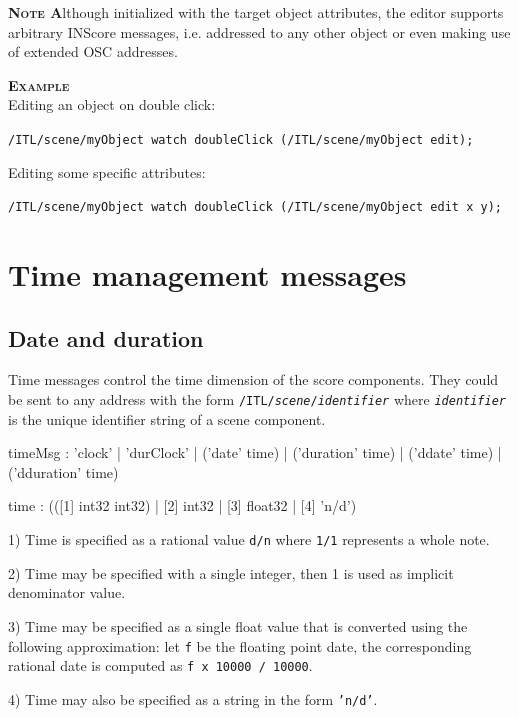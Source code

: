 \documentclass[a4paper,twoside]{report}
\newcommand{\toplevel}[1]	{\chapter{#1}}
\newcommand{\sublevel}[1]	{\section{#1}}
\newcommand{\OSC}[1]		{\texttt{#1}}
\newcommand{\values}[1]		{\texttt{#1}}
\newcommand{\example}		{\textbf{\hspace{-1.5cm}\textbf{\textsc{Example }}}}
\newcommand{\note}	[1]		{\vspace{2mm}\textbf{\hspace{-0.9cm}\textbf{\textsc{Note #1}}}}
\let\olditemize\itemize
\let\oldenditemize\enditemize
\renewenvironment{itemize} 	{\olditemize \setlength{\itemsep}{1mm}}{\oldenditemize}
\newcommand{\sample}	[1]			{\vspace{-2mm}\begin{center}\colorbox{mygrey}{
								\begin{minipage}[t]{0.9\columnwidth} 
								{\small \texttt{#1}}
								\end{minipage}}\end{center}}
\begin{document}
\note Although initialized with the target object attributes, the editor supports arbitrary INScore messages, i.e. addressed to any other object or even making use of extended OSC addresses.

\example \\
Editing an object on double click:
\sample{/ITL/scene/myObject watch doubleClick (/ITL/scene/myObject edit);}
Editing some specific attributes:
\sample{/ITL/scene/myObject watch doubleClick (/ITL/scene/myObject edit x y);}



\toplevel{Time management messages}
\label{time}
\sublevel{Date and duration}
Time messages control the time dimension of the score components. They could be sent to any address with the form \OSC{/ITL/\textit{scene}/\textit{identifier}} where \OSC{\textit{identifier}} is the unique identifier string of a scene component.
\begin{rail}
timeMsg : 'clock'
		| 'durClock' 
		| ('date' time)
		| ('duration' time) 
		| ('ddate' time) 
		| ('dduration' time) 
\end{rail}

\begin{rail}
time : (([1] int32 int32) | [2] int32 | [3] float32 | [4] 'n/d')
\end{rail}

\begin{itemize}
\item 1) Time is specified as a rational value \values{d/n} where \values{1/1} represents a whole note. 
\item 2) Time may be specified with a single integer, then 1 is used as implicit denominator value.
\item 3) Time may be specified as a single float value that is converted using the following approximation: let \values{f} be the floating point date, the corresponding rational date is computed as \values{f x 10000 / 10000}.
\item 4) Time may also be specified as a string in the form \OSC{'n/d'}.
\end{itemize}
\end{document}
